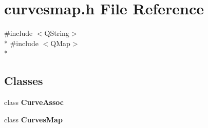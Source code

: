 \section{curvesmap.\+h File Reference}
\label{extscaleplotscenewidget_2curvesmap_8h}
{\ttfamily \#include $<$Q\+String$>$}\\*
{\ttfamily \#include $<$Q\+Map$>$}\\*
\subsection*{Classes}
\begin{DoxyCompactItemize}
\item 
class {\bf Curve\+Assoc}
\item 
class {\bf Curves\+Map}
\end{DoxyCompactItemize}
